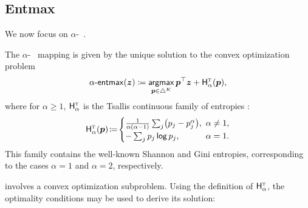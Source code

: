 \subsection{Entmax}\label{sec:entmax_bg}

\noindent We now focus on $\alpha$-\entmaxtext~\citep{blondel2019learning,entmax}.

\newpage

\begin{definition}[$\aentmax$]
    The $\alpha$-\entmaxtext~\citep{blondel2019learning,entmax} mapping
    is given by the unique solution to the convex optimization problem
    \begin{equation}\label{eq:define_entmax}
        \mathop{\mathsf{\alpha}\textnormal{-}\mathsf{entmax}}(\bm{z}) \coloneqq
        \operatorname*{\mathsf{argmax}}_{\bm{p} \in \triangle^K} \bm{p}^\top\bm{z} + \mathsf{H}^{{\textsc{t}}}_{\alpha}(\bm{p}),
    \end{equation}
    where for $\alpha\geq1$,
    $\mathsf{H}^{{\textsc{t}}}_\alpha$ is the Tsallis continuous family of entropies
    \citep{Tsallis1988}:
    \begin{equation}\label{eq:tsallisdef}
        \HHt_{\alpha}(\bm{p})\!\coloneqq\!
        \begin{cases}
            \frac{1}{\alpha(\alpha-1)}\sum_j\!\left(p_j - p_j^\alpha\right)\!, &
            \!\!\!\alpha \ne 1,                                                  \\
            -\sum_j \pp_j \log \pp_j,                                          &
            \!\!\!\alpha = 1.
        \end{cases}
    \end{equation}
    This family contains the well-known Shannon and Gini entropies,
    corresponding to the cases $\alpha=1$ and $\alpha=2$, respectively.
\end{definition}

 involves a convex optimization subproblem. Using the
definition of $\mathsf{H}^{{\textsc{t}}}_\alpha$, the optimality conditions may be used to derive its solution:

